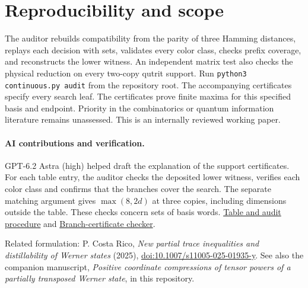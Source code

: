 \documentclass[11pt]{article}
\begin{document}
\section*{Reproducibility and scope}
The auditor rebuilds compatibility from the parity of three Hamming distances, replays each decision with sets, validates every color class, checks prefix coverage, and reconstructs the lower witness. An independent matrix test also checks the physical reduction on every two-copy qutrit support. Run \texttt{python3 continuous.py audit} from the repository root. The accompanying certificates specify every search leaf. The certificates prove finite maxima for this specified basis and endpoint. Priority in the combinatorics or quantum information literature remains unassessed. This is an internally reviewed working paper.

\paragraph{AI contributions and verification.} GPT-6.2 Astra (high) helped draft the explanation of the support certificates. For each table entry, the auditor checks the deposited lower witness, verifies each color class and confirms that the branches cover the search. The separate matching argument gives $\max(8,2d)$ at three copies, including dimensions outside the table. These checks concern sets of basis words. \href{https://github.com/shunyaekam/oo-research/blob/a5cde30636afbfe599efab6bf8bbbafe9c640c22/continuous.py}{Table and audit procedure} and \href{https://github.com/shunyaekam/oo-research/blob/a5cde30636afbfe599efab6bf8bbbafe9c640c22/supports.py}{Branch-certificate checker}.

\smallskip\noindent Related formulation: P. Costa Rico, \emph{New partial trace inequalities and distillability of Werner states} (2025), \href{https://doi.org/10.1007/s11005-025-01935-y}{doi:10.1007/s11005-025-01935-y}. See also the companion manuscript, \emph{Positive coordinate compressions of tensor powers of a partially transposed Werner state}, in this repository.
\end{document}
